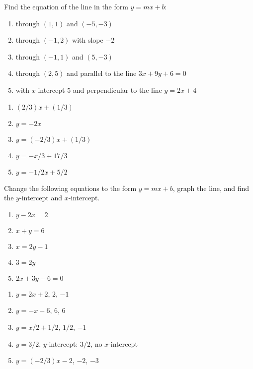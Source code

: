 \begin{enumialphparenastyle}

\begin{ex}
Find the equation of the line in the form $y=mx+b$:
\begin{enumerate}
	\item	through $(1,1)$ and $(-5, -3)$
	\item	through $(-1,2)$ with slope $-2$
	\item	through $(-1,1)$ and $(5, -3)$
	\item	through $(2,5)$ and parallel to the line $3x+9y+6=0$
	\item	with $x$-intercept 5 and perpendicular to the line $y=2x+4$
\end{enumerate}
\begin{sol}
\begin{enumerate}
	\item	$(2/3)x+(1/3)$
	\item	$y=-2x$
	\item	$y=(-2/3)x+(1/3)$
	\item	$y=-x/3+17/3$
	\item	$y=-1/2x+5/2$
\end{enumerate}
\end{sol}
\end{ex}

\begin{ex}
Change the following equations to the form $y=mx+b$, graph the
line, and find the $y$-intercept and $x$-intercept.
\begin{enumerate}
	\item	$y-2x=2$
	\item	$x+y=6$
	\item	$x=2y-1$
	\item	$3=2y$
	\item	$2x+3y+6=0$
\end{enumerate}
\begin{sol}
\begin{enumerate}
	\item	$y=2x+2$, $2$, $-1$
	\item	$y=-x+6$, $6$, $6$
	\item	$y=x/2+1/2$, $1/2$, $-1$
	\item	$y=3/2$, $y$-intercept: $3/2$, no $x$-intercept
	\item	$y=(-2/3)x-2$, $-2$, $-3$
\end{enumerate}
\end{sol}
\end{ex}
 

\end{enumialphparenastyle}
